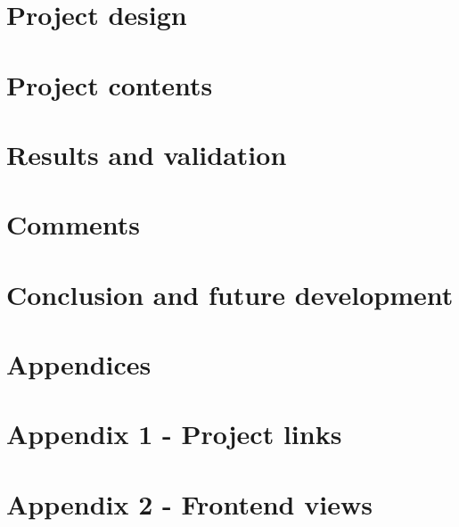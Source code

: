 \documentclass[12pt, a4paper]{report}
\begin{document}
    \chapter{Project design}\label{ch:project-design}
    

    \chapter{Project contents}\label{ch:project-contents}
    

    \chapter{Results and validation}\label{ch:results-and-validation}
    

    \chapter{Comments}\label{ch:comments}
    

    \chapter{Conclusion and future development}\label{ch:summary}
    

    \pagebreak
    \printbibliography

    \pagebreak
    \appendix
    \chapter*{Appendices}
    \renewcommand{\thechapter}{\arabic{chapter}}

    \label{chapter:appendix-project-links}
    {\clearpage\relax\chapter*{Appendix 1 - Project links}}
    

    \clearpage
    \label{chapter:appendix-frontend-viws}
    \chapter*{Appendix 2 - Frontend views}
    
\end{document}

